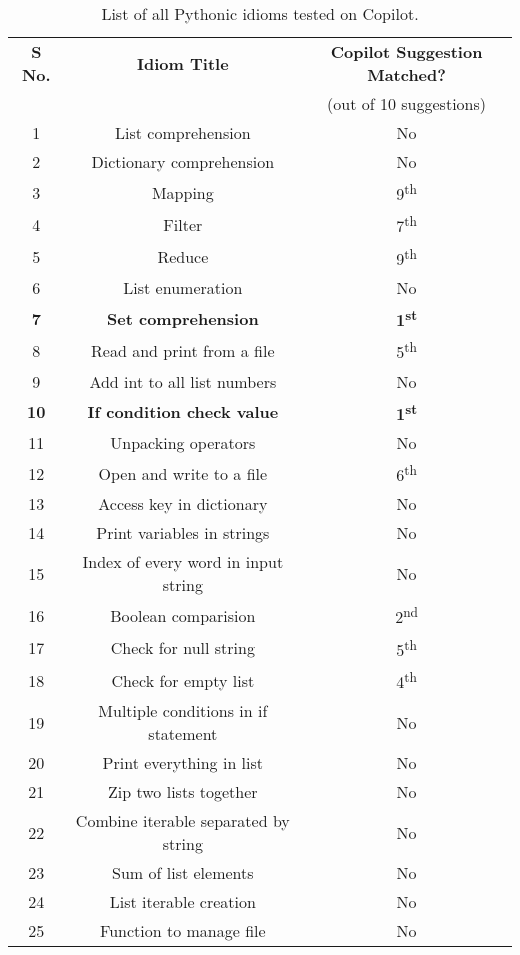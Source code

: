 \begin{table}[hbt!]

    \begin{tabular}{|c|c|c|}
        \hline
        \centering
         \textbf{S No.} & \textbf{Idiom Title} & \textbf{Copilot Suggestion Matched?}  \\
         & & (out of 10 suggestions) \\
         \hline
         1 & List comprehension & No \\
         \hline
         2 & Dictionary comprehension & No \\
         \hline
         3 & Mapping & 9\textsuperscript{th} \\
         \hline
         4 & Filter &  7\textsuperscript{th} \\
         \hline
         5 & Reduce & 9\textsuperscript{th} \\
         \hline
         6 & List enumeration & No \\
         \hline
         \textbf{7} & \textbf{Set comprehension} & \textbf{1\textsuperscript{st}} \\
         \hline
         8 & Read and print from a file & 5\textsuperscript{th} \\
         \hline
         9 & Add int to all list numbers & No \\
         \hline
         \textbf{10} & \textbf{If condition check value} & \textbf{1\textsuperscript{st}} \\
         \hline
         11 & Unpacking operators & No \\
         \hline
         12 & Open and write to a file & 6\textsuperscript{th} \\
         \hline
         13 & Access key in dictionary & No \\
         \hline
         14 & Print variables in strings & No \\
         \hline
         15 & Index of every word in input string & No \\
         \hline
         16 & Boolean comparision & 2\textsuperscript{nd} \\
         \hline
         17 & Check for null string & 5\textsuperscript{th} \\
         \hline
         18 & Check for empty list & 4\textsuperscript{th} \\
         \hline
         19 & Multiple conditions in if statement & No \\
         \hline
         20 & Print everything in list & No \\
         \hline
         21 & Zip two lists together & No \\
         \hline
         22 & Combine iterable separated by string & No \\
         \hline
         23 & Sum of list elements & No \\
         \hline
         24 & List iterable creation & No \\
         \hline
         25 & Function to manage file & No \\
         \hline
    \end{tabular}
    \caption{List of all Pythonic idioms tested on Copilot.}
    \label{tab:all_idioms}
\end{table}
